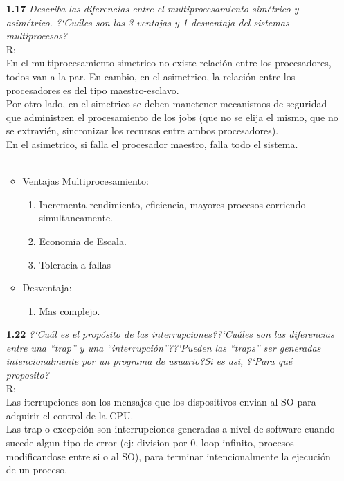 \begin{itemize}
\item[\textbf{1.17}] \emph{Describa las diferencias entre el multiprocesamiento sim\'etrico y asim\'etrico. ?`Cu\'ales son las 3 ventajas y 1 desventaja del sistemas multiprocesos?}\\
R:\\
	En el multiprocesamiento simetrico no existe relaci\'on entre los procesadores, todos van a la par. En cambio, en el asimetrico, la relaci\'on entre los procesadores es del tipo maestro-esclavo.\\
	Por otro lado, en el simetrico se deben manetener mecanismos de seguridad que administren el procesamiento de los jobs (que no se elija el mismo, que no se extravi\'en, sincronizar los recursos entre ambos procesadores).\\
	 En el asimetrico, si falla el procesador maestro, falla todo el sistema.\\\\
	\begin{itemize}
	\item Ventajas Multiprocesamiento:
	\begin{enumerate}
		\item Incrementa rendimiento, eficiencia, mayores procesos corriendo simultaneamente.
		\item Economia de Escala.
		\item Toleracia a fallas
	\end{enumerate}
	\item Desventaja:
	\begin{enumerate}
		\item Mas complejo.
	\end{enumerate}
	\end{itemize}

\item[\textbf{1.22}] \emph{?`Cu\'al es el prop\'osito de las
interrupciones??`Cu\'ales son las diferencias entre una ``trap'' y una
``interrupci\'on''??`Pueden las ``traps'' ser generadas intencionalmente por
un programa de usuario?Si es asi, ?`Para qu\'e proposito?}\\
R:\\
		Las iterrupciones son los mensajes que los dispositivos envian al SO para adquirir el control de la CPU.\\
		Las trap o excepci\'on son interrupciones generadas a nivel de software cuando sucede algun tipo de error (ej: division por 0, loop infinito, procesos modificandose entre si o al SO), para terminar intencionalmente la ejecuci\'on de un proceso.\\


\end{itemize}

